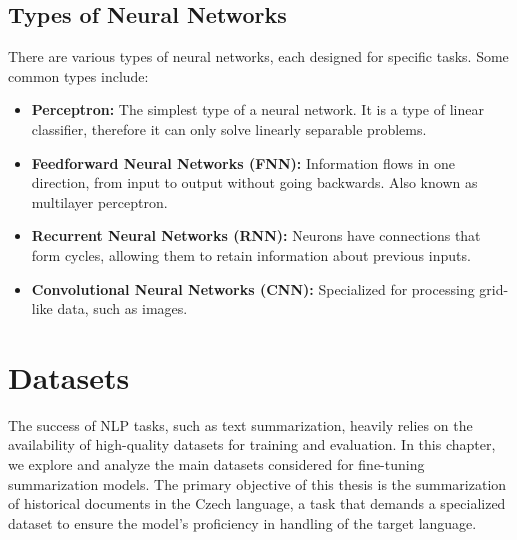 \documentclass[english, ba, kiv, he, iso690numb, pdf, viewonly]{fasthesis}
\begin{document}
	\section{Types of Neural Networks}
	
	There are various types of neural networks, each designed for specific tasks. Some common types include:
	
	\begin{itemize}
		\item \textbf{Perceptron:} The simplest type of a neural network. It is a type of linear classifier, therefore it can only solve linearly separable problems.
		
		\item \textbf{Feedforward Neural Networks (FNN):} Information flows in one direction, from input to output without going backwards. Also known as multilayer perceptron.
		
		\item \textbf{Recurrent Neural Networks (RNN):} Neurons have connections that form cycles, allowing them to retain information about previous inputs.
		
		\item \textbf{Convolutional Neural Networks (CNN):} Specialized for processing grid-like data, such as images.
	\end{itemize}
	\chapter{Datasets} \label{datasets}
	The success of NLP tasks, such as text summarization, heavily relies on the availability of high-quality datasets for training and evaluation. In this chapter, we explore and analyze the main datasets considered for fine-tuning summarization models. The primary objective of this thesis is the summarization of historical documents in the Czech language, a task that demands a specialized dataset to ensure the model's proficiency in handling of the target language.
	
\end{document}
